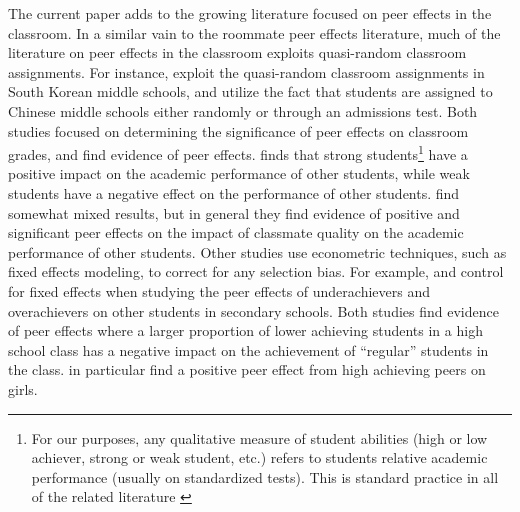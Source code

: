 \documentclass[12pt,letterpaper,english,fleqn]{article}
\begin{document}
The current paper adds to the growing literature focused on peer effects in the classroom.
In a similar vain to the roommate peer effects literature, much of the literature on peer effects in the classroom exploits quasi-random classroom assignments.
For instance, \citet{kang2007classroom} exploit the quasi-random classroom assignments in South Korean middle schools, and \citet{carman2012classroom} utilize the fact that students are assigned to Chinese middle schools either randomly or through an admissions test.
Both studies focused on determining the significance of peer effects on classroom grades, and find evidence of peer effects.
\citet{kang2007classroom} finds that strong students\footnote{For our purposes, any qualitative measure of student abilities (high or low achiever, strong or weak student, etc.) refers to students relative academic performance (usually on standardized tests). This is standard practice in all of the related literature \citep{carman2012classroom,burke2013classroom,kang2007classroom,schlosser2008inside,lavy2012good}} have a positive impact on the academic performance of other students, while weak students have a negative effect on the performance of other students. 
\citet{carman2012classroom} find somewhat mixed results, but in general they find evidence of positive and significant peer effects on the impact of classmate quality on the academic performance of other students.
Other studies use econometric techniques, such as fixed effects modeling, to correct for any selection bias.
For example, \citet{schlosser2008inside} and \citet{lavy2012good} control for fixed effects when studying the peer effects of underachievers and overachievers on other students in secondary schools.
Both studies find evidence of peer effects where a larger proportion of lower achieving students in a high school class has a negative impact on the achievement of ``regular'' students in the class.
\citet{lavy2012good} in particular find a positive peer effect from high achieving peers on girls.
\end{document}

